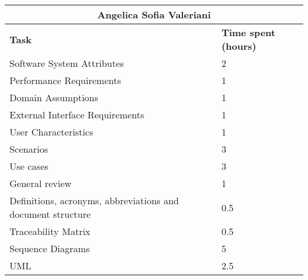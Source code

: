 \begin{table}[ht]
  \center
  \begin{tabular}{l|l}
    \multicolumn{2}{c}{\textbf{Angelica Sofia Valeriani}} \\
    \hline
    \textbf{Task} & \textbf{Time spent (hours)}\\
    \hline
    Software System Attributes & 2 \\
    Performance Requirements & 1 \\
    Domain Assumptions & 1 \\
    External Interface Requirements & 1 \\
    User Characteristics & 1 \\
    Scenarios & 3 \\
    Use cases & 3 \\
    General review & 1 \\
    Definitions, acronyms, abbreviations and document structure & 0.5 \\
    Traceability Matrix & 0.5 \\
    Sequence Diagrams & 5 \\
    UML & 2.5 \\
  \end{tabular}
\end{table}